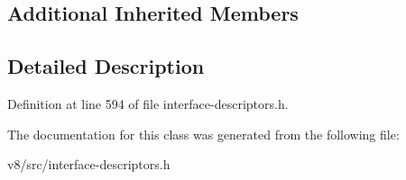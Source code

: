 \subsection*{Additional Inherited Members}


\subsection{Detailed Description}


Definition at line 594 of file interface-\/descriptors.\+h.



The documentation for this class was generated from the following file\+:\begin{DoxyCompactItemize}
\item 
v8/src/interface-\/descriptors.\+h\end{DoxyCompactItemize}
